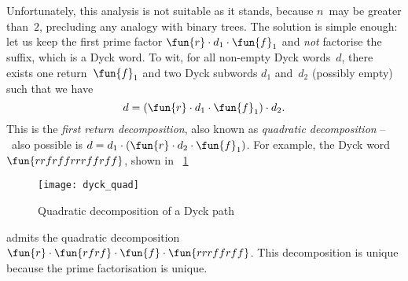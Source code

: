 Unfortunately, this analysis is not suitable as it stands, because
\(n\)~may be greater than~\(2\), precluding any analogy with binary
trees. The solution is simple enough: let us keep the first prime
factor \(\fun{r} \cdot d_1 \cdot \fun{f}_1\) and \emph{not} factorise
the suffix, which is a Dyck word. To wit, for all non\hyp{}empty Dyck
words~\(d\), there exists one return~\(\fun{f}_1\) and two Dyck
subwords \(d_1\) and~\(d_2\) (possibly empty) such that we have
\begin{equation*}
d = (\fun{r} \cdot d_1 \cdot \fun{f}_1) \cdot d_2.
\end{equation*}
This is the \emph{first return decomposition}, also known as
\emph{quadratic decomposition} --~also possible is \(d = d_1 \cdot (\fun{r} \cdot d_2 \cdot
\fun{f}_1)\). For example, the Dyck word \(\fun{rrfrffrrrffrff}\),
shown in \fig~\ref{fig:dyck_quad}
\begin{figure}
\centering
\texttt{[image: dyck\_quad]}
\caption{Quadratic decomposition of a Dyck path}
\label{fig:dyck_quad}
\end{figure}
admits the quadratic decomposition \(\fun{r} \cdot \fun{rfrf} \cdot
\fun{f} \cdot \fun{rrrffrff}\). This decomposition is unique because
the prime factorisation is unique.


